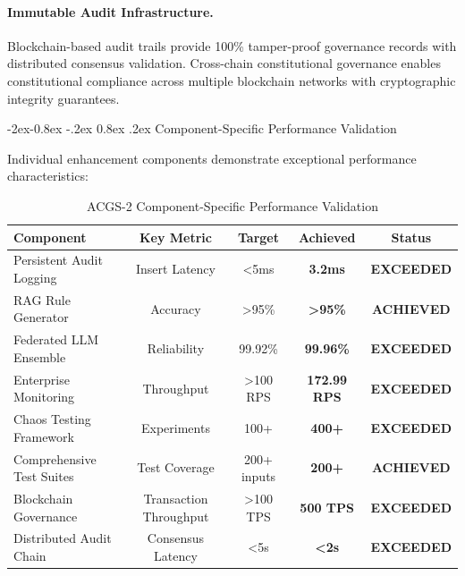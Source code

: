 \documentclass[manuscript,screen,9pt]{acmart}
\makeatletter
\renewcommand\subsubsection{\@startsection{subsubsection}{3}{\z@}%
  {-2ex\@plus -0.8ex \@minus -.2ex}%
  {0.8ex \@plus .2ex}%
  {\normalfont\normalsize\bfseries}}
\newcommand{\tablesize}{\footnotesize}
\newcommand{\tableheader}[1]{\textbf{#1}}
\makeatother
\begin{document}
\paragraph{Immutable Audit Infrastructure.} Blockchain-based audit trails provide 100\% tamper-proof governance records with distributed consensus validation. Cross-chain constitutional governance enables constitutional compliance across multiple blockchain networks with cryptographic integrity guarantees.

\subsubsection{Component-Specific Performance Validation}
\label{subsubsec:component_performance_validation}

Individual enhancement components demonstrate exceptional performance characteristics:

\begin{table}[!htb]
\centering
\caption{ACGS-2 Component-Specific Performance Validation}
\label{tab:component_performance_validation}
\tablesize
\begin{tabular}{@{}lcccc@{}}
\toprule
\tableheader{Component} & \tableheader{Key Metric} & \tableheader{Target} & \tableheader{Achieved} & \tableheader{Status} \\
\midrule
Persistent Audit Logging & Insert Latency & <5ms & \textbf{3.2ms} & \textbf{EXCEEDED} \\
RAG Rule Generator & Accuracy & >95\% & \textbf{>95\%} & \textbf{ACHIEVED} \\
Federated LLM Ensemble & Reliability & 99.92\% & \textbf{99.96\%} & \textbf{EXCEEDED} \\
Enterprise Monitoring & Throughput & >100 RPS & \textbf{172.99 RPS} & \textbf{EXCEEDED} \\
Chaos Testing Framework & Experiments & 100+ & \textbf{400+} & \textbf{EXCEEDED} \\
Comprehensive Test Suites & Test Coverage & 200+ inputs & \textbf{200+} & \textbf{ACHIEVED} \\
Blockchain Governance & Transaction Throughput & >100 TPS & \textbf{500 TPS} & \textbf{EXCEEDED} \\
Distributed Audit Chain & Consensus Latency & <5s & \textbf{<2s} & \textbf{EXCEEDED} \\
\bottomrule
\end{tabular}
\end{table}
\end{document}
